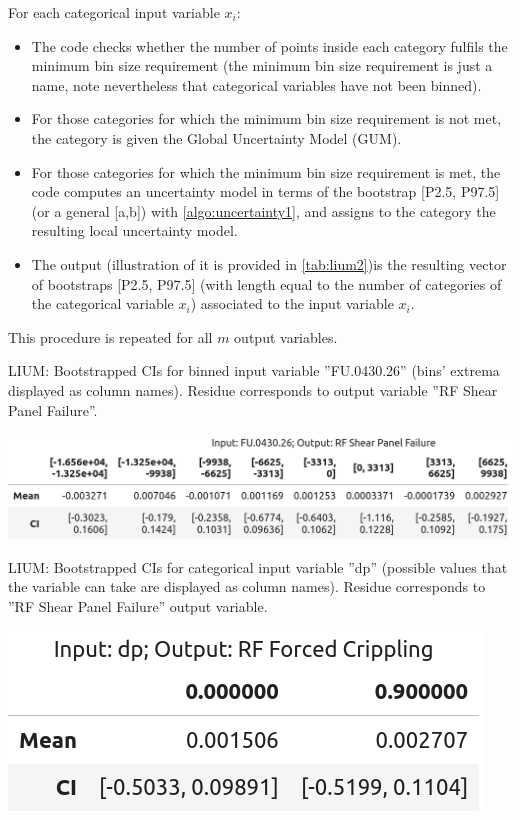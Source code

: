 \indent For each categorical input variable $x_i$:
\begin{itemize}
	\item The code checks whether the number of points inside each category fulfils the minimum bin size requirement (the minimum bin size requirement is just a name, note nevertheless that categorical variables have not been binned).
	\item For those categories for which the minimum bin size requirement is not met, the category is given the Global Uncertainty Model (GUM).
	\item For those categories for which the minimum bin size requirement is met, the code computes an uncertainty model in terms of the bootstrap [P2.5, P97.5] (or a general [a,b]) with \autoref{algo:uncertainty1}, and assigns to the category the resulting local uncertainty model.
	\item The output (illustration of it is provided in \autoref{tab:lium2})is the resulting vector of bootstraps [P2.5, P97.5] (with length equal to the number of categories of the categorical variable $x_i$) associated to the input variable $x_i$.\\
\end{itemize}

\indent This procedure is repeated for all $m$ output variables.\\

\begin{table}
	\centering
	\caption{LIUM: Bootstrapped CIs for binned input variable ''FU.0430.26'' (bins' extrema displayed as column names). Residue corresponds to output variable ''RF Shear Panel Failure''.}
	\includegraphics[scale=\tabscale]{Figures/uncertainty/liumtab1.png}
	\label{tab:lium1}
\end{table}
\begin{table}
	\centering
	\caption{LIUM: Bootstrapped CIs for categorical input variable ''dp'' (possible values that the variable can take are displayed as column names). Residue corresponds to ''RF Shear Panel Failure'' output variable.}
	\includegraphics[scale=\tabscale]{Figures/uncertainty/liumtab2.png}
	\label{tab:lium2}
\end{table}

